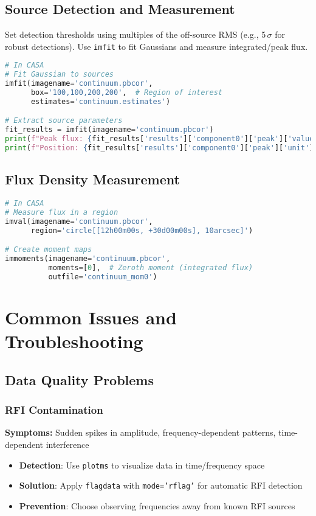 \documentclass[11pt]{article}
\begin{document}
\subsection{Source Detection and Measurement}
Set detection thresholds using multiples of the off-source RMS (e.g., 5\,$\sigma$ for robust detections). Use \texttt{imfit} to fit Gaussians and measure integrated/peak flux.
\begin{lstlisting}[language=Python]
# In CASA
# Fit Gaussian to sources
imfit(imagename='continuum.pbcor', 
      box='100,100,200,200',  # Region of interest
      estimates='continuum.estimates')

# Extract source parameters
fit_results = imfit(imagename='continuum.pbcor')
print(f"Peak flux: {fit_results['results']['component0']['peak']['value']:.6f} Jy/beam")
print(f"Position: {fit_results['results']['component0']['peak']['unit']}")
\end{lstlisting}

\subsection{Flux Density Measurement}
\begin{lstlisting}[language=Python]
# In CASA
# Measure flux in a region
imval(imagename='continuum.pbcor', 
      region='circle[[12h00m00s, +30d00m00s], 10arcsec]')

# Create moment maps
immoments(imagename='continuum.pbcor', 
          moments=[0],  # Zeroth moment (integrated flux)
          outfile='continuum_mom0')
\end{lstlisting}

\section{Common Issues and Troubleshooting}

\subsection{Data Quality Problems}

\subsubsection{RFI Contamination}
\textbf{Symptoms:} Sudden spikes in amplitude, frequency-dependent patterns, time-dependent interference
\begin{itemize}
    \item \textbf{Detection}: Use \texttt{plotms} to visualize data in time/frequency space
    \item \textbf{Solution}: Apply \texttt{flagdata} with \texttt{mode='rflag'} for automatic RFI detection
    \item \textbf{Prevention}: Choose observing frequencies away from known RFI sources
\end{itemize}
\end{document}
